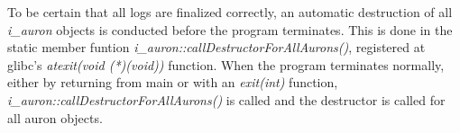 			To be certain that all logs are finalized correctly, an automatic destruction of all \emph{i\_auron} objects is conducted before the program terminates.
			This is done in the static member funtion \emph{i\_auron::callDestructorForAllAurons()}, registered at glibc's \emph{atexit(void (*)(void))} function.
			When the program terminates normally, either by returning from main or with an \emph{exit(int)} function, \emph{i\_auron::callDestructorForAllAurons()} is called and the destructor is called for all auron objects.







